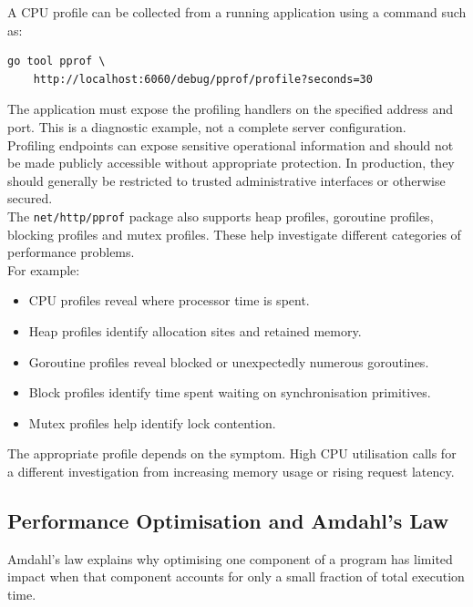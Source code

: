 A CPU profile can be collected from a running application using a command such as:

\begin{lstlisting}
go tool pprof \
    http://localhost:6060/debug/pprof/profile?seconds=30
\end{lstlisting}

The application must expose the profiling handlers on the specified address and port. This is a diagnostic example, not a complete server configuration.\\

Profiling endpoints can expose sensitive operational information and should not be made publicly accessible without appropriate protection. In production, they should generally be restricted to trusted administrative interfaces or otherwise secured.\\

The \texttt{net/http/pprof} package also supports heap profiles, goroutine profiles, blocking profiles and mutex profiles. These help investigate different categories of performance problems.\\

For example:

\begin{itemize}
    \item CPU profiles reveal where processor time is spent.
    \item Heap profiles identify allocation sites and retained memory.
    \item Goroutine profiles reveal blocked or unexpectedly numerous goroutines.
    \item Block profiles identify time spent waiting on synchronisation primitives.
    \item Mutex profiles help identify lock contention.
\end{itemize}

The appropriate profile depends on the symptom. High CPU utilisation calls for a different investigation from increasing memory usage or rising request latency.\\

\subsection{Performance Optimisation and Amdahl's Law}

Amdahl's law explains why optimising one component of a program has limited impact when that component accounts for only a small fraction of total execution time.\\

